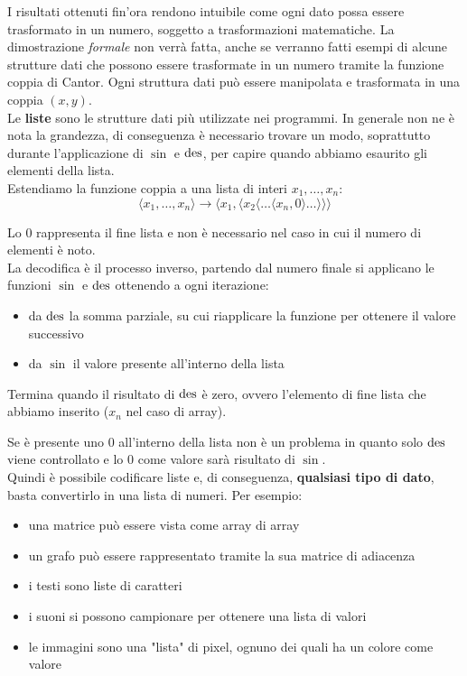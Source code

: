 I risultati ottenuti fin'ora rendono intuibile come ogni dato possa essere trasformato in un numero, soggetto a trasformazioni matematiche. La dimostrazione \textit{formale} non verrà fatta, anche se verranno fatti esempi di alcune strutture dati che possono essere trasformate in un numero tramite la funzione coppia di Cantor. Ogni struttura dati può essere manipolata e trasformata in una coppia $(x,y)$.\\

Le \textbf{liste} sono le strutture dati più utilizzate nei programmi. In generale non ne è nota la grandezza, di conseguenza è necessario trovare un modo, soprattutto durante l'applicazione di $\sin$ e $\operatorname{des}$, per capire quando abbiamo esaurito gli elementi della lista.\\

Estendiamo la funzione coppia a una lista di interi $x_1, \dots, x_n$:
$$ \langle x_1, \dots, x_n \rangle \rightarrow \langle x_1, \langle x_2 \langle \dots \langle x_n, 0 \rangle \dots \rangle \rangle \rangle $$

Lo $0$ rappresenta il fine lista e non è necessario nel caso in cui il numero di elementi è noto.\\

La decodifica è il processo inverso, partendo dal numero finale si applicano le funzioni $\sin$ e $\operatorname{des}$ ottenendo a ogni iterazione: 
\begin{itemize}
	\item da $\operatorname{des}$ la somma parziale, su cui riapplicare la funzione per ottenere il valore successivo
	\item da $\sin$ il valore presente all'interno della lista
\end{itemize} 
Termina quando il risultato di $\operatorname{des}$ è zero, ovvero l'elemento di fine lista che abbiamo inserito ($x_n$ nel caso di array).
\begin{center}
	
\end{center}
Se è presente uno 0 all'interno della lista non è un problema in quanto solo $\operatorname{des}$ viene controllato e lo 0 come valore sarà risultato di $\sin$.\\

Quindi è possibile codificare liste e, di conseguenza, \textbf{qualsiasi tipo di dato}, basta convertirlo in una lista di numeri. Per esempio:
\begin{itemize}
	\item una matrice può essere vista come array di array
	\item un grafo può essere rappresentato tramite la sua matrice di adiacenza
	\item i testi sono liste di caratteri
	\item i suoni si possono campionare per ottenere una lista di valori
	\item le immagini sono una "lista" di pixel, ognuno dei quali ha un colore come valore
\end{itemize}

